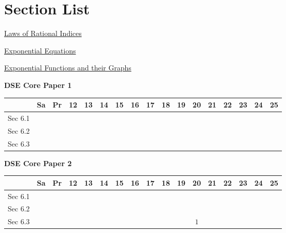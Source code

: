 \documentclass[12pt, a4paper]{article}
\begin{document}
\section*{Section List}
\begin{enumx}[label=Sec 6.\arabic*\ ]
\item \hyperref[section:4-6-1]{Laws of Rational Indices \NF}
\item \hyperref[section:4-6-2]{Exponential Equations \NF}
\item \hyperref[section:4-6-3]{Exponential Functions and their Graphs \NF}
\end{enumx}
\begin{absolutelynopagebreak}
\begin{center}
\textbf{DSE Core Paper 1}
\end{center}
\begin{center}
\begin{tabular}{|l|c|c|c|c|c|c|c|c|c|c|c|c|c|c|c|c|}
\hline
        & Sa & Pr & 12 & 13 & 14 & 15 & 16 & 17 & 18 & 19 & 20 & 21 & 22 & 23 & 24 & 25 \\\hline\hline
Sec 6.1 &  &  &  &  &  &  &  &  &  &  &  &  &  &  &  &  \\\hline
Sec 6.2 &  &  &  &  &  &  &  &  &  &  &  &  &  &  &  &  \\\hline
Sec 6.3 &  &  &  &  &  &  &  &  &  &  &  &  &  &  &  &  \\\hline
\end{tabular}
\end{center}
\end{absolutelynopagebreak}
\begin{absolutelynopagebreak}
\begin{center}
\textbf{DSE Core Paper 2}
\end{center}
\begin{center}
\begin{tabular}{|l|c|c|c|c|c|c|c|c|c|c|c|c|c|c|c|c|}
\hline
        & Sa & Pr & 12 & 13 & 14 & 15 & 16 & 17 & 18 & 19 & 20 & 21 & 22 & 23 & 24 & 25 \\\hline\hline
Sec 6.1 &  &  &  &  &  &  &  &  &  &  &  &  &  &  &  &  \\\hline
Sec 6.2 &  &  &  &  &  &  &  &  &  &  &  &  &  &  &  &  \\\hline
Sec 6.3 &  &  &  &  &  &  &  &  &  &  &  $1$ &  &  &  &  &  \\\hline
\end{tabular}
\end{center}
\end{absolutelynopagebreak}
\end{document}
